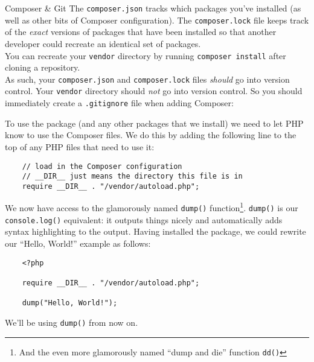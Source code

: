\begin{infobox}{Composer \& Git}
    The \texttt{composer.json} tracks which packages you've installed (as well as other bits of Composer configuration). The \texttt{composer.lock} file keeps track of the \textit{exact} versions of packages that have been installed so that another developer could recreate an identical set of packages.
    \\

    You can recreate your \texttt{vendor} directory by running \texttt{composer install} after cloning a repository.
    \\

    As such, your \texttt{composer.json} and \texttt{composer.lock} files \textit{should} go into version control. Your \texttt{vendor} directory should \textit{not} go into version control. So you should immediately create a \texttt{.gitignore} file when adding Composer:


\end{infobox}

\pagebreak

To use the package (and any other packages that we install) we need to let PHP know to use the Composer files. We do this by adding the following line to the top of any PHP files that need to use it:

\begin{verbatim}
    // load in the Composer configuration
    // __DIR__ just means the directory this file is in
    require __DIR__ . "/vendor/autoload.php";
\end{verbatim}

We now have access to the glamorously named \texttt{dump()} function\footnote{And the even more glamorously named ``dump and die'' function \texttt{dd()}}. \texttt{dump()} is our \texttt{console.log()} equivalent: it outputs things nicely and automatically adds syntax highlighting to the output. Having installed the package, we could rewrite our ``Hello, World!'' example as follows:

\begin{verbatim}
    <?php

    require __DIR__ . "/vendor/autoload.php";

    dump("Hello, World!");
\end{verbatim}

We'll be using \texttt{dump()} from now on.

\pagebreak

